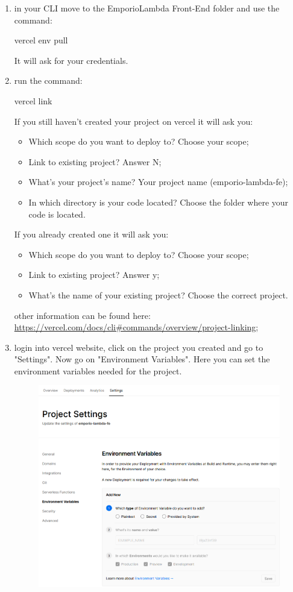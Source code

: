 \begin{enumerate}
\item in your CLI move to the EmporioLambda Front-End folder and use the command:\begin{center}vercel env pull\end{center}It will ask for your credentials.
\item run the command:\begin{center}vercel link\end{center} If you still haven't created your project on vercel it will ask you:
\begin{itemize}
\item Which scope do you want to deploy to? Choose your scope;
\item Link to existing project? Answer N;
\item What’s your project’s name? Your project name (emporio-lambda-fe);
\item In which directory is your code located? Choose the folder where your code is located.
\end{itemize}
If you already created one it will ask you:
\begin{itemize}
\item Which scope do you want to deploy to? Choose your scope;
\item Link to existing project? Answer y;
\item What’s the name of your existing project? Choose the correct project.
\end{itemize}
other information can be found here: \url{https://vercel.com/docs/cli\#commands/overview/project-linking};
\item login into vercel website, click on the project you created and go to "Settings". Now go on "Environment Variables". Here you can set the environment variables needed for the project.\\
\begin{figure}[H]
\centering
\includegraphics[scale=0.55]{res/Setup/Configurazione/img/settingsEnvVar}\\

\end{figure}
\end{enumerate}
